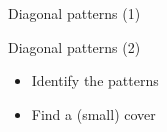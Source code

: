 \documentclass[10pt]{beamer}
\begin{document}
\begin{frame}{Diagonal patterns (1)}
\begin{figure}
\centering
{}
\end{figure}
\end{frame}


\begin{frame}{Diagonal patterns (2)}
\begin{itemize}
\item[Step 1] Identify the patterns
\item[Step 2] Find a (small) cover
\end{itemize}
\end{frame}
\end{document}
